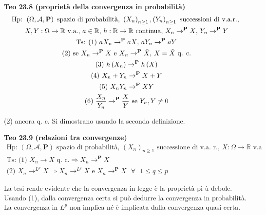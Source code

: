 \documentclass{article}
\begin{document}
\textbf{Teo 23.8 (propriet\`{a} della convergenza in probabilit\`{a})}%
\begin{gather*}
\text{Hp: }\left( \Omega ,\mathcal{A},\mathbf{P}\right) \text{ spazio di
probabilit\`{a}, }\left( X_{n}\right) _{n\geq 1},\left( Y_{n}\right) _{n\geq
1}\text{ successioni di v.a.r., } \\
X,Y:\Omega \rightarrow 
\mathbb{R}
\text{ v.a., }a\in 
\mathbb{R}
\text{, }h:%
\mathbb{R}
\rightarrow 
\mathbb{R}
\text{ continua, }X_{n}\rightarrow ^{\mathbf{P}}X\text{, }Y_{n}\rightarrow ^{%
\mathbf{P}}Y \\
\text{Ts: (1) }aX_{n}\rightarrow ^{\mathbf{P}}aX\text{, }aY_{n}\rightarrow ^{%
\mathbf{P}}aY \\
\text{(2) se }X_{n}\rightarrow ^{\mathbf{P}}X\text{ e }X_{n}\rightarrow ^{%
\mathbf{P}}\tilde{X}\text{, }X=\tilde{X}\text{ q. c.} \\
\text{(3) }h\left( X_{n}\right) \rightarrow ^{\mathbf{P}}h\left( X\right) \\
\text{(4) }X_{n}+Y_{n}\rightarrow ^{\mathbf{P}}X+Y \\
\text{(5) }X_{n}Y_{n}\rightarrow ^{\mathbf{P}}XY \\
\text{(6) }\frac{X_{n}}{Y_{n}}\rightarrow ^{\mathbf{P}}\frac{X}{Y}\text{ se }%
Y_{n},Y\neq 0
\end{gather*}

(2) ancora q. c. Si dimostrano usando la seconda definizione.

\textbf{Teo 23.9 (relazioni tra convergenze)}%
\begin{gather*}
\text{Hp: }\left( \Omega ,\mathcal{A},\mathbf{P}\right) \text{ spazio di
probabilit\`{a}, }\left( X_{n}\right) _{n\geq 1}\text{ successione di v.a.
r., }X:\Omega \rightarrow 
\mathbb{R}
\text{ v.a} \\
\text{Ts: (1) }X_{n}\rightarrow X\text{ q. c.}\Longrightarrow
X_{n}\rightarrow ^{\mathbf{P}}X \\
\text{(2) }X_{n}\rightarrow ^{L^{p}}X\Longrightarrow X_{n}\rightarrow
^{L^{q}}X\text{ e }X_{n}\rightarrow ^{\mathbf{P}}X\text{ }\forall \text{ }%
1\leq q\leq p
\end{gather*}

La tesi rende evidente che la convergenza in legge \`{e} la propriet\`{a} pi%
\`{u} debole. Usando (1), dalla convergenza certa si pu\`{o} dedurre la
convergenza in probabilit\`{a}. La convergenza in $L^{p}$ non implica n\'{e} 
\`{e} implicata dalla convergenza quasi certa.
\end{document}

